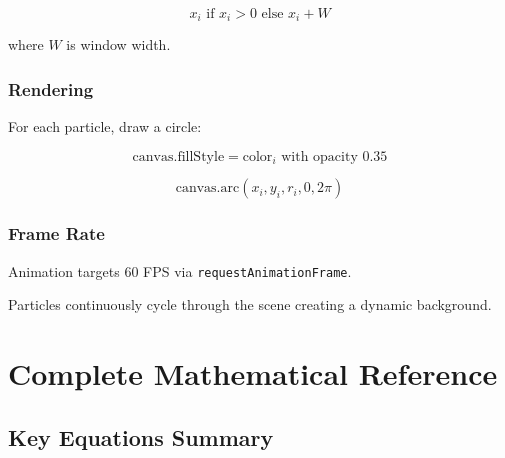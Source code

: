 \documentclass[10pt]{article}
\begin{document}
\begin{equation}
x_i \text{ if } x_i > 0 \text{ else } x_i + W
\end{equation}

where $W$ is window width.

\subsubsection{Rendering}

For each particle, draw a circle:

\begin{equation}
\text{canvas.fillStyle} = \text{color}_i
\text{ with opacity } 0.35
\end{equation}

\begin{equation}
\text{canvas.arc}(x_i, y_i, r_i, 0, 2\pi)
\end{equation}

\subsubsection{Frame Rate}

Animation targets 60 FPS via \texttt{requestAnimationFrame}.

Particles continuously cycle through the scene creating a dynamic background.


\section{Complete Mathematical Reference}

\subsection{Key Equations Summary}
\end{document}
